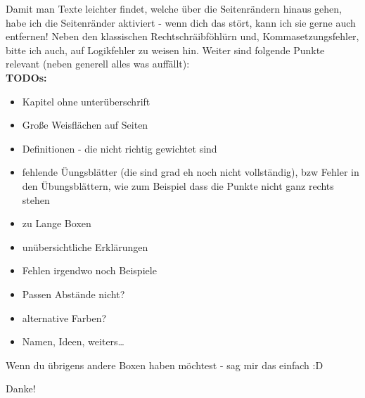 {\begin{titlepage}
Damit man Texte leichter findet, welche über die Seitenrändern hinaus gehen, habe ich die Seitenränder aktiviert - wenn dich das stört, kann ich sie gerne auch entfernen!
Neben den klassischen Rechtschräibföhlürn und, Kommasetzungsfehler, bitte ich auch, auf Logikfehler zu weisen hin. Weiter sind folgende Punkte relevant (neben generell alles was auffällt):\\[0.25cm]
\textbf{TODOs:}
\begin{itemize}[label=$\square$]\setlength{\itemsep}{0pt}
    \item Kapitel ohne unterüberschrift
    \item Große Weisflächen auf Seiten
    \item Definitionen - die nicht richtig gewichtet sind
    \item fehlende Üungsblätter (die sind grad eh noch nicht vollständig), bzw Fehler in den Übungsblättern, wie zum Beispiel dass die Punkte nicht ganz rechts stehen
    \item zu Lange Boxen
    \item unübersichtliche Erklärungen
    \item Fehlen irgendwo noch Beispiele
    \item Passen Abstände nicht?
    \item alternative Farben?
    \item Namen, Ideen, weiters\ldots\\[0.25cm]
\end{itemize}
Wenn du übrigens andere Boxen haben möchtest - sag mir das einfach :D\\[0.5cm]
{\par\centering\Huge Danke! \Ninja\par}
\end{titlepage}
\newpage
}
